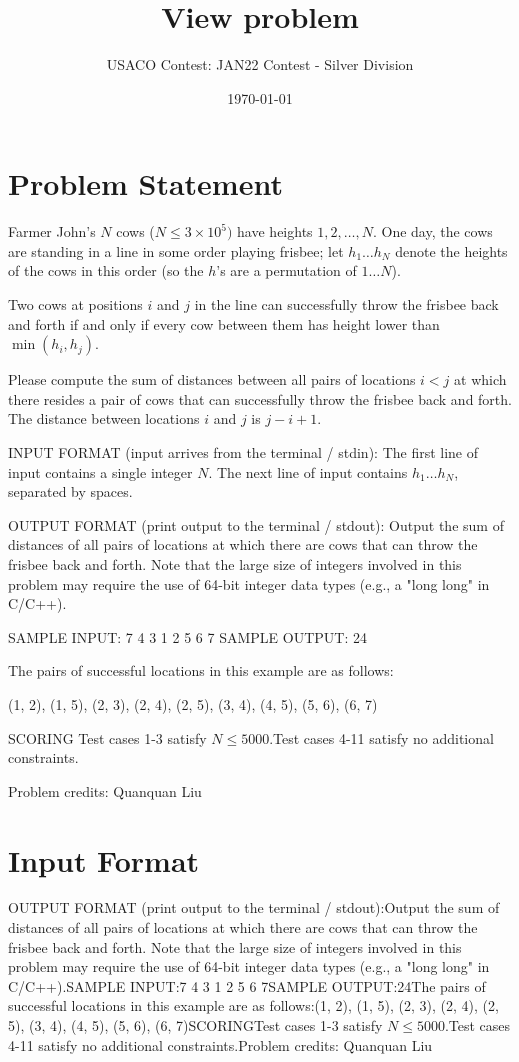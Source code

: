 \documentclass[12pt]{article}
\title{View problem}
\author{USACO Contest: JAN22 Contest - Silver Division}
\date{\today}
\begin{document}
\maketitle

\section*{Problem Statement}

Farmer John's $N$ cows ($N \leq 3 \times 10^5)$ have heights $1, 2, \ldots, N$.  One day, the cows are
standing in a line in some order playing frisbee; let $h_1 \ldots h_N$ denote
the heights of the cows in this order (so the $h$'s are a permutation of
$1 \ldots N$). 

Two cows at positions $i$ and $j$ in the line can successfully throw the frisbee
back and forth if and only if every cow between them has height lower than
$\min(h_i, h_j)$.  

Please compute the sum of distances between all pairs of locations $i<j$ at
which there resides a pair of cows that can successfully throw the frisbee  back
and forth.  The distance between locations $i$ and $j$ is $j-i+1$.

INPUT FORMAT (input arrives from the terminal / stdin):
The first line of input contains a single integer $N$. The next line of input
contains $h_1 \ldots h_N$, separated by spaces.

OUTPUT FORMAT (print output to the terminal / stdout):
Output the sum of distances of all pairs of locations at which there  are cows
that can throw the frisbee back and forth.  Note that the large  size of
integers involved in this problem may require the use of 64-bit integer data
types (e.g., a "long long" in C/C++).

SAMPLE INPUT:
7
4 3 1 2 5 6 7
SAMPLE OUTPUT: 
24

The pairs of successful locations in this example are as follows:


(1, 2), (1, 5), (2, 3), (2, 4), (2, 5), (3, 4), (4, 5), (5, 6), (6, 7)

SCORING
Test cases 1-3 satisfy $N\le 5000$.Test cases 4-11 satisfy no
additional constraints.


Problem credits: Quanquan Liu



\section*{Input Format}
OUTPUT FORMAT (print output to the terminal / stdout):Output the sum of distances of all pairs of locations at which there  are cows
that can throw the frisbee back and forth.  Note that the large  size of
integers involved in this problem may require the use of 64-bit integer data
types (e.g., a "long long" in C/C++).SAMPLE INPUT:7
4 3 1 2 5 6 7SAMPLE OUTPUT:24The pairs of successful locations in this example are as follows:(1, 2), (1, 5), (2, 3), (2, 4), (2, 5), (3, 4), (4, 5), (5, 6), (6, 7)SCORINGTest cases 1-3 satisfy $N\le 5000$.Test cases 4-11 satisfy no
additional constraints.Problem credits: Quanquan Liu
\end{document}
